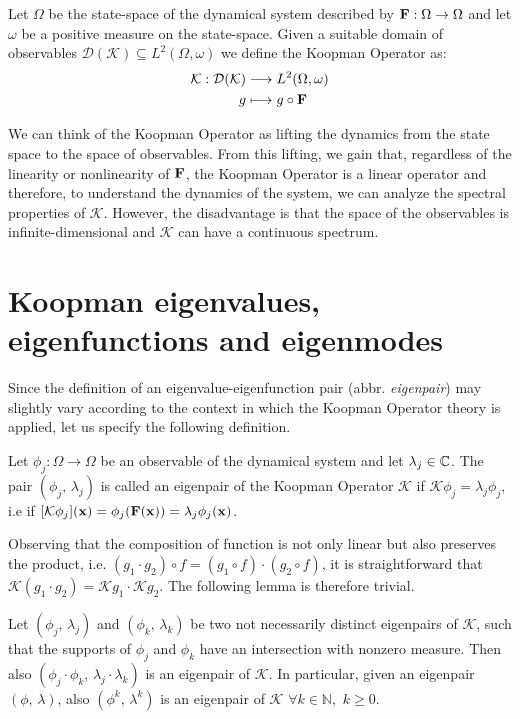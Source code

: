 \begin{definition}
Let $\Omega$ be the state-space of the dynamical system described by $\vb{F}:\Omega\to\Omega$ and let $\omega$ be a positive measure on the state-space. Given a suitable domain of observables $\mathcal{D}(\mathcal{K}) \subseteq L^2(\Omega, \omega)$ we define the Koopman Operator as:
\begin{equation}
    \label{koopman_def}
    \begin{split}
       \mathcal{K} : \mathcal{D}(\mathcal{K}) &\longrightarrow L^2(\Omega, \omega)
       \\
       g & \longmapsto g \circ \vb{F}
    \end{split}    
\end{equation} 
\end{definition}

We can think of the Koopman Operator as lifting the dynamics from the state space to the space of observables. From this lifting, we gain that, regardless of the linearity or nonlinearity of $\vb{F}$, the Koopman Operator is a linear operator and therefore, to understand the dynamics of the system, we can analyze the spectral properties of $\mathcal{K}$. However, the disadvantage is that the space of the observables is infinite-dimensional and $\mathcal{K}$ can have a continuous spectrum. 

\section{Koopman eigenvalues, eigenfunctions and eigenmodes}

Since the definition of an eigenvalue-eigenfunction pair (abbr. \emph{eigenpair}) may slightly vary according to the context in which the Koopman Operator theory is applied, let us specify the following definition.
\begin{definition}
Let $\phi_j:\Omega\to\Omega$ be an observable of the dynamical system and let $\lambda_j\in\mathbb{C}$. The pair $(\phi_j, \,\lambda_j)$ is called an eigenpair of the Koopman Operator $\mathcal{K}$ if $\mathcal{K}\phi_j = \lambda_j\phi_j$, i.e if $[\mathcal{K}\phi_j](\vb{x}) = \phi_j(\vb{F}(\vb{x})) = \lambda_j\phi_j(\vb{x})$.
\end{definition}

Observing that the composition of function is not only linear but also preserves the product, i.e. $(g_1 \cdot g_2) \circ f = (g_1 \circ f) \cdot (g_2 \circ f)$, it is straightforward that $\mathcal{K}(g_1\cdot g_2) = \mathcal{K}g_1\cdot \mathcal{K}g_2$. The following lemma is therefore trivial.
\begin{lemma}
\label{eigenpair_multiplication}
Let $(\phi_j, \,\lambda_j)$ and $(\phi_k, \,\lambda_k)$ be two not necessarily distinct eigenpairs of $\mathcal{K}$, such that the supports of $\phi_j$ and $\phi_k$ have an intersection with nonzero measure. Then also $(\phi_j\cdot\phi_k, \,\lambda_j\cdot\lambda_k)$ is an eigenpair of $\mathcal{K}$. In particular, given an eigenpair $(\phi, \,\lambda)$, also $(\phi^k, \,\lambda^k)$ is an eigenpair of $\mathcal{K}$ $\forall k\in\mathbb{N},\,\, k \geq 0$.
\end{lemma}

